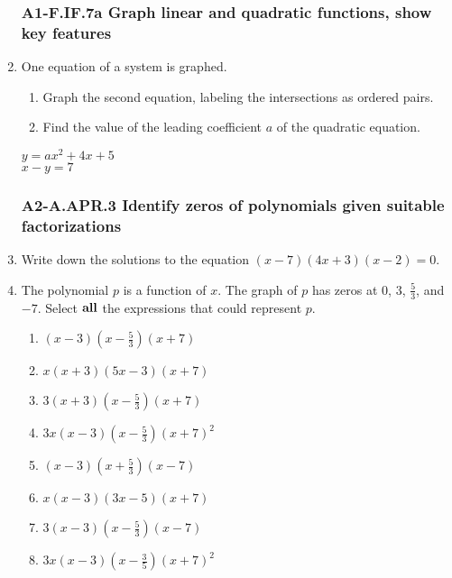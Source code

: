 \documentclass[12pt, twoside]{article}
\begin{document}
\begin{enumerate}[itemsep=0.5cm]
\newpage
\subsubsection*{A1-F.IF.7a Graph linear and quadratic functions, show key features}
\item One equation of a system is graphed. 
\begin{enumerate}
    \item Graph the second equation, labeling the intersections as ordered pairs.
    \item Find the value of the leading coefficient $a$ of the quadratic equation.
\end{enumerate}
\begin{multicols}{2}
    \hspace{1cm} $y = ax^2 + 4x + 5$ \\
    \columnbreak
    $x - y = 7$
    \end{multicols}
     \vspace{3cm}

  \begin{center}
  \end{center}
  

\newpage
\subsubsection*{A2-A.APR.3 Identify zeros of polynomials given suitable factorizations}
\item Write down the solutions to the equation $(x - 7)(4x + 3)(x - 2) = 0$. \vspace{2cm} 

\item The polynomial $p$ is a function of $x$. The graph of $p$ has zeros at $0$, $3$, $\frac{5}{3}$, and $-7$. Select $\bf{all}$ the expressions that could represent $p$. \vspace{0.25cm}
    \begin{multicols}{2}
    \begin{enumerate}
        \item $(x-3)(x-\frac{5}{3})(x+7)$
        \item $x(x+3)(5x-3)(x+7)$
        \item $3(x+3)(x-\frac{5}{3})(x+7)$
        \item $3x(x-3)(x-\frac{5}{3})(x+7)^2$
        \item $(x-3)(x+\frac{5}{3})(x-7)$
        \item $x(x-3)(3x-5)(x+7)$
        \item $3(x-3)(x-\frac{5}{3})(x-7)$
        \item $3x(x-3)(x-\frac{3}{5})(x+7)^2$
    \end{enumerate}
    \end{multicols}


\end{enumerate}
\end{document}
